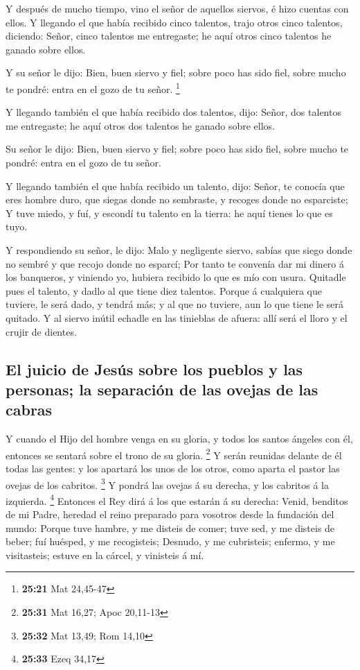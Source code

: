  Y después de mucho tiempo, vino el señor de aquellos
siervos, é hizo cuentas con ellos.  Y llegando el que había
recibido cinco talentos, trajo otros cinco talentos, diciendo: Señor,
cinco talentos me entregaste; he aquí otros cinco talentos he ganado
sobre ellos.

 Y su señor le dijo: Bien, buen siervo y fiel; sobre poco
has sido fiel, sobre mucho te pondré: entra en el gozo de tu señor.
\footnote{\textbf{25:21} Mat 24,45-47}

 Y llegando también el que había recibido dos talentos,
dijo: Señor, dos talentos me entregaste; he aquí otros dos talentos he
ganado sobre ellos.

 Su señor le dijo: Bien, buen siervo y fiel; sobre poco has
sido fiel, sobre mucho te pondré: entra en el gozo de tu señor.

 Y llegando también el que había recibido un talento, dijo:
Señor, te conocía que eres hombre duro, que siegas donde no sembraste, y
recoges donde no esparciste;  Y tuve miedo, y fuí, y
escondí tu talento en la tierra: he aquí tienes lo que es tuyo.

 Y respondiendo su señor, le dijo: Malo y negligente
siervo, sabías que siego donde no sembré y que recojo donde no esparcí;
 Por tanto te convenía dar mi dinero á los banqueros, y
viniendo yo, hubiera recibido lo que es mío con usura. 
Quitadle pues el talento, y dadlo al que tiene diez talentos.
 Porque á cualquiera que tuviere, le será dado, y tendrá
más; y al que no tuviere, aun lo que tiene le será quitado.
 Y al siervo inútil echadle en las tinieblas de afuera:
allí será el lloro y el crujir de dientes.

\hypertarget{el-juicio-de-jesuxfas-sobre-los-pueblos-y-las-personas-la-separaciuxf3n-de-las-ovejas-de-las-cabras}{%
\subsection{El juicio de Jesús sobre los pueblos y las personas; la
separación de las ovejas de las
cabras}\label{el-juicio-de-jesuxfas-sobre-los-pueblos-y-las-personas-la-separaciuxf3n-de-las-ovejas-de-las-cabras}}

 Y cuando el Hijo del hombre venga en su gloria, y todos
los santos ángeles con él, entonces se sentará sobre el trono de su
gloria. \footnote{\textbf{25:31} Mat 16,27; Apoc 20,11-13} 
Y serán reunidas delante de él todas las gentes: y los apartará los unos
de los otros, como aparta el pastor las ovejas de los cabritos.
\footnote{\textbf{25:32} Mat 13,49; Rom 14,10}  Y pondrá
las ovejas á su derecha, y los cabritos á la izquierda. \footnote{\textbf{25:33}
  Ezeq 34,17}  Entonces el Rey dirá á los que estarán á su
derecha: Venid, benditos de mi Padre, heredad el reino preparado para
vosotros desde la fundación del mundo:  Porque tuve hambre,
y me disteis de comer; tuve sed, y me disteis de beber; fuí huésped, y
me recogisteis;  Desnudo, y me cubristeis; enfermo, y me
visitasteis; estuve en la cárcel, y vinisteis á mí.

